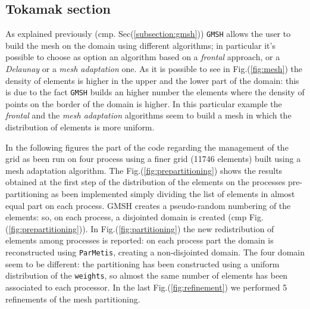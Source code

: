 \subsection{Tokamak section}\label{subsection:Tokamak_section}
As explained previously (cmp. Sec(\ref{subsection:gmsh})) \verb|GMSH| allows the user to build the mesh on the domain using different algorithms; in particular it's possible to choose as option an algorithm based on a \textit{frontal} approach, or a \textit{Delaunay} or a \textit{mesh adaptation} one. As it is possible to see in Fig.(\ref{fig:mesh}) the density of elements is higher in the upper  and the lower part of the domain: this is due to the fact \verb|GMSH| builds an higher number the elements where the density of points on the border of the domain is higher. In this particular example the \textit{frontal} and the \textit{mesh adaptation} algorithms seem to build a mesh in which the distribution of elements is more uniform.
\medskip

In the following figures the part of the code regarding the management of the grid as been run on four process using a finer grid (11746 elements) built using a mesh adaptation algorithm. The Fig.(\ref{fig:prepartitioning}) shows the results obtained at the first step of the distribution of the elements on the processes pre-partitioning as been implemented simply dividing the list of elements in almost equal part on each process. GMSH creates a pseudo-random numbering of the elements: so, on each process, a disjointed domain is created (cmp Fig.(\ref{fig:prepartitioning})). In Fig.(\ref{fig:partitioning}) the new redistribution of elements among processes is reported: on each process part the domain is reconstructed using \verb|ParMetis|, creating a non-disjointed domain. The four domain seem to be different: the partitioning has been constructed using a uniform distribution of the \verb|weights|, so almost the same number of elements has been associated to each processor. In the last Fig.(\ref{fig:refinement}) we performed 5 refinements of the mesh partitioning.

